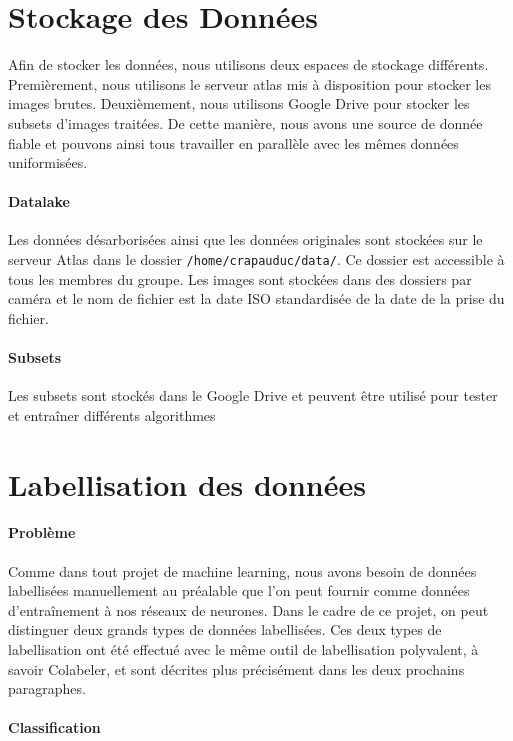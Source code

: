 \section{Stockage des Données}
Afin de stocker les données, nous utilisons deux espaces de stockage différents. Premièrement, nous utilisons le serveur atlas mis à disposition pour stocker les images brutes. Deuxièmement, nous utilisons Google Drive pour stocker les subsets d'images traitées. De cette manière, nous avons une source de donnée fiable et pouvons ainsi tous travailler en parallèle avec les mêmes données uniformisées.

\paragraph*{Datalake}

Les données désarborisées ainsi que les données originales sont stockées sur le serveur Atlas dans le dossier \texttt{/home/crapauduc/data/}. Ce dossier est accessible à tous les membres du groupe. Les images sont stockées dans des dossiers par caméra et le nom de fichier est la date ISO standardisée de la date de la prise du fichier.

\paragraph{Subsets}

Les subsets sont stockés dans le Google Drive et peuvent être utilisé pour tester et entraîner différents algorithmes

\section{Labellisation des données}

\paragraph{Problème}

Comme dans tout projet de machine learning, nous avons besoin de données labellisées manuellement au préalable que l'on peut fournir comme données d'entraînement à nos réseaux de neurones. Dans le cadre de ce projet, on peut distinguer deux grands types de données labellisées. Ces deux types de labellisation ont été effectué avec le même outil de labellisation polyvalent, à savoir Colabeler, et sont décrites plus précisément dans les deux prochains paragraphes.

\paragraph{Classification}

